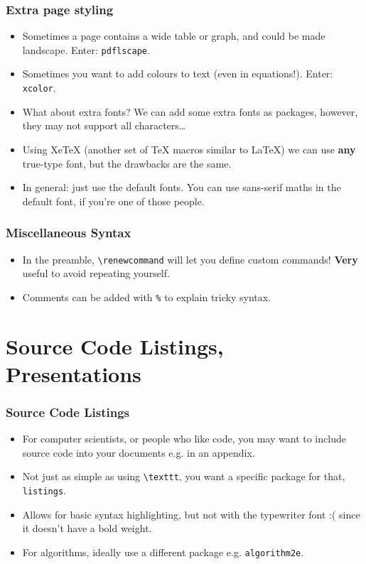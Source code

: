 \documentclass{beamer}
\begin{document}
\begin{frame}
	\frametitle{Extra page styling}
	\begin{itemize}
		\item Sometimes a page contains a wide table or graph, and could be made landscape. Enter: \texttt{pdflscape}.
		\item Sometimes you want to add colours to text (even in equations!). Enter: \texttt{xcolor}.
		\item What about extra fonts? We can add some extra fonts as packages, however, they may not support all characters\dots
		\item Using XeTeX (another set of TeX macros similar to \LaTeX{}) we can use \textbf{any} true-type font, but the drawbacks are the same.
		\item In general: just use the default fonts. You can use sans-serif maths in the default font, if you're one of those people.
	\end{itemize}
\end{frame}

\begin{frame}
	\frametitle{Miscellaneous Syntax}
	\begin{itemize}
		\item In the preamble, \texttt{\textbackslash{}renewcommand} will let you define custom commands! \textbf{Very} useful to avoid repeating yourself.
		\item Comments can be added with \texttt{\%} to explain tricky syntax.
	\end{itemize}
\end{frame}

\section{Source Code Listings, Presentations}

\begin{frame}
	\frametitle{Source Code Listings}
	\begin{itemize}
		\item For computer scientists, or people who like code, you may want to include source code into your documents e.g. in an appendix.
		\item Not just as simple as using \texttt{\textbackslash{}texttt}, you want a specific package for that, \texttt{listings}.
		\item Allows for basic syntax highlighting, but not with the typewriter font :( since it doesn't have a bold weight.
		\item For algorithms, ideally use a different package e.g. \texttt{algorithm2e}.
	\end{itemize}
\end{frame}
\end{document}
